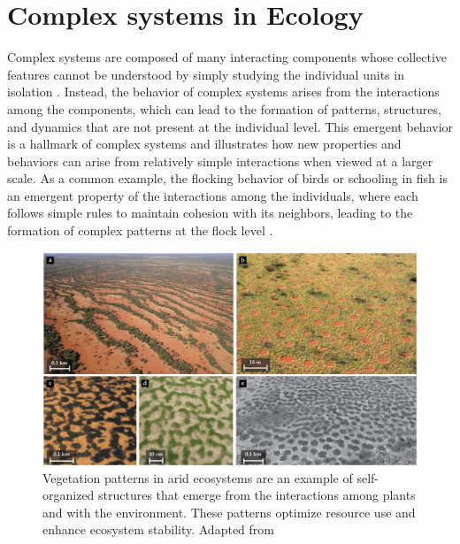 \section{\label{sec:Complex systems in Ecology} Complex systems in Ecology}

Complex systems are composed of many interacting components
whose collective features cannot be understood by simply studying the
individual units in isolation \cite{Bianconi_2023}. Instead, the behavior of
complex systems arises from the interactions among the components, which can
lead to the formation of patterns, structures, and dynamics that are not
present at the individual level. This emergent behavior is a hallmark of
complex systems and illustrates how new properties and behaviors can arise from
relatively simple interactions when viewed at a larger scale. As a common
example, the flocking behavior of birds or schooling in fish is an emergent
property of the interactions among the individuals, where each follows simple
rules to maintain cohesion with its neighbors, leading to the formation of
complex patterns at the flock level \cite{Vicsek1995}.

\begin{figure}[H]
  \centering
  \includegraphics[width=\textwidth]{Figures/vegetation_patterns.jpg}
  \caption{\label{fig:vegetation_patterns} Vegetation patterns in arid
    ecosystems
    are an example of self-organized structures that emerge from the
    interactions
    among plants and with the environment. These patterns optimize resource use
    and enhance ecosystem stability. Adapted from \cite{Ehud2019}}
\end{figure}

